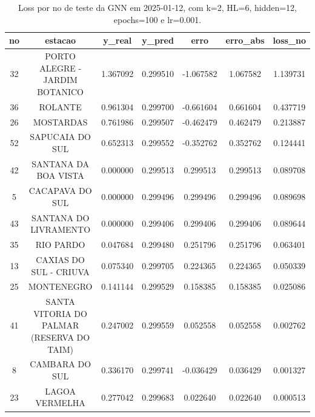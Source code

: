 \begin{table}[h]
\centering
\caption{Loss por no de teste da GNN em 2025-01-12, com k=2, HL=6, hidden=12, epochs=100 e lr=0.001.}
\label{tab:gnn_loss_k2_hl6_h12_e100_d20250112}
\begin{tabular}{ccccccc}
\toprule
no & estacao & y\_real & y\_pred & erro & erro\_abs & loss\_no \\
\midrule
32 & PORTO ALEGRE - JARDIM BOTANICO & 1.367092 & 0.299510 & -1.067582 & 1.067582 & 1.139731 \\
36 & ROLANTE & 0.961304 & 0.299700 & -0.661604 & 0.661604 & 0.437719 \\
26 & MOSTARDAS & 0.761986 & 0.299507 & -0.462479 & 0.462479 & 0.213887 \\
52 & SAPUCAIA DO SUL & 0.652313 & 0.299552 & -0.352762 & 0.352762 & 0.124441 \\
42 & SANTANA DA BOA VISTA & 0.000000 & 0.299513 & 0.299513 & 0.299513 & 0.089708 \\
5 & CACAPAVA DO SUL & 0.000000 & 0.299496 & 0.299496 & 0.299496 & 0.089698 \\
43 & SANTANA DO LIVRAMENTO & 0.000000 & 0.299406 & 0.299406 & 0.299406 & 0.089644 \\
35 & RIO PARDO & 0.047684 & 0.299480 & 0.251796 & 0.251796 & 0.063401 \\
13 & CAXIAS DO SUL - CRIUVA & 0.075340 & 0.299705 & 0.224365 & 0.224365 & 0.050339 \\
25 & MONTENEGRO & 0.141144 & 0.299529 & 0.158385 & 0.158385 & 0.025086 \\
41 & SANTA VITORIA DO PALMAR (RESERVA DO TAIM) & 0.247002 & 0.299559 & 0.052558 & 0.052558 & 0.002762 \\
8 & CAMBARA DO SUL & 0.336170 & 0.299741 & -0.036429 & 0.036429 & 0.001327 \\
23 & LAGOA VERMELHA & 0.277042 & 0.299683 & 0.022640 & 0.022640 & 0.000513 \\
\bottomrule
\end{tabular}
\end{table}
